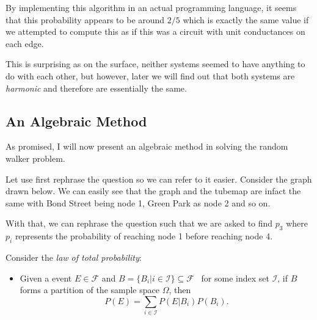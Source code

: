 \documentclass[]{article}
\providecommand{\tightlist}{%
  \setlength{\itemsep}{0pt}\setlength{\parskip}{0pt}}
\begin{document}
By implementing this algorithm in an actual programming language, it
seems that this probability appears to be around \(2 / 5\) which is
exactly the same value if we attempted to compute this as if this was a
circuit with unit conductances on each edge.

This is surprising as on the surface, neither systems seemed to have
anything to do with each other, but however, later we will find out that
both systems are \emph{harmonic} and therefore are essentially the same.

\subsection{An Algebraic Method}\label{an-algebraic-method}

As promised, I will now present an algebraic method in solving the
random walker problem.

Let use first rephrase the question so we can refer to it easier.
Consider the graph drawn below. We can easily see that the graph and the
tubemap are infact the same with Bond Street being node 1, Green Park as
node 2 and so on.

With that, we can rephrase the question such that we are asked to find
\(p_3\) where \(p_i\) represents the probability of reaching node 1
before reaching node 4.

Consider the \emph{law of total probability}:

\begin{itemize}
\tightlist
\item
  Given a event \(E \in \mathcal{F}\) and
  \(B = \{B_i | i \in \mathcal{I}\} \subseteq \mathcal{F}\)~ for some
  index set \(\mathcal{I}\), if \(B\) forms a partition of the sample
  space \(\Omega\), then \[
  P(E) = \sum_{i \in \mathcal{I}}P(E | B_i)P(B_i).
  \]
\end{itemize}
\end{document}
